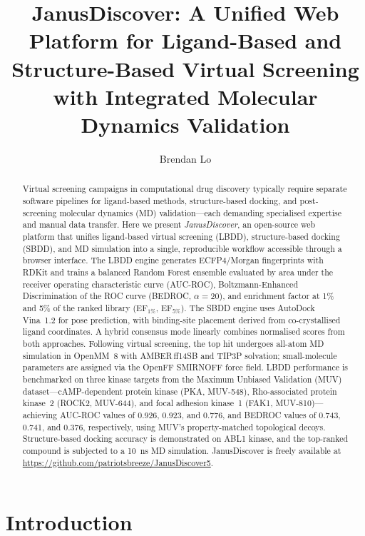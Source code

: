 \documentclass[journal=jcisd8,manuscript=article]{achemso}
\author{Brendan Lo}
\affiliation{Department of Chemistry, University of Chicago,
             Chicago, Illinois 60637, United States}
\title{JanusDiscover: A Unified Web Platform for Ligand-Based and
       Structure-Based Virtual Screening with Integrated Molecular
       Dynamics Validation}
\begin{document}

\begin{abstract}
Virtual screening campaigns in computational drug discovery typically
require separate software pipelines for ligand-based methods, structure-based
docking, and post-screening molecular dynamics (MD) validation---each
demanding specialised expertise and manual data transfer.  Here we present
\textit{JanusDiscover}, an open-source web platform that unifies
ligand-based virtual screening (LBDD), structure-based docking (SBDD), and
MD simulation into a single, reproducible workflow accessible through a
browser interface.  The LBDD engine generates ECFP4/Morgan fingerprints with
RDKit and trains a balanced Random Forest ensemble evaluated by
area under the receiver operating characteristic curve (AUC-ROC),
Boltzmann-Enhanced Discrimination of the ROC curve
(BEDROC, $\alpha = 20$), and enrichment factor at 1\% and 5\% of the ranked
library (EF$_{1\%}$, EF$_{5\%}$).  The SBDD engine uses AutoDock Vina~1.2
for pose prediction, with binding-site placement derived from co-crystallised
ligand coordinates.  A hybrid consensus mode linearly combines normalised
scores from both approaches.  Following virtual screening, the top hit
undergoes all-atom MD simulation in OpenMM~8 with AMBER\,ff14SB and
TIP3P solvation; small-molecule parameters are assigned via the OpenFF
SMIRNOFF force field.  LBDD performance is benchmarked on three kinase targets from the
Maximum Unbiased Validation (MUV) dataset\cite{rohrer2009muv}---cAMP-dependent
protein kinase (PKA, MUV-548), Rho-associated protein kinase~2 (ROCK2, MUV-644),
and focal adhesion kinase~1 (FAK1, MUV-810)---achieving AUC-ROC values of
0.926, 0.923, and 0.776, and BEDROC values of 0.743, 0.741, and 0.376,
respectively, using MUV's property-matched topological decoys.
Structure-based docking accuracy is demonstrated on ABL1 kinase, and the
top-ranked compound is subjected to a \SI{10}{\nano\second} MD simulation.
JanusDiscover is freely available at
\url{https://github.com/patriotsbreeze/JanusDiscover5}.
\end{abstract}

\section{Introduction}
\end{document}
